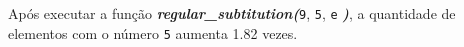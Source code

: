 \documentclass[12pt,varwidth=16cm,border=1pt]{standalone}
\begin{document}
Após executar a função \textbf{\textit{regular\_subtitution(}}\verb+9+, \verb+5+, \verb+e+ \textbf{\textit{)}}, a quantidade de elementos com o número \verb+5+ aumenta 1.82 vezes.

\questiomtrue
\end{document}
